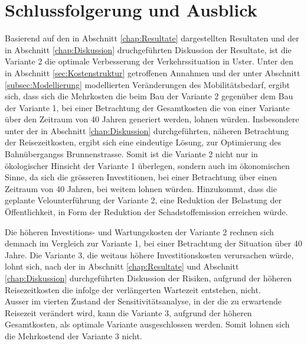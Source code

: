 %
%
%
%

\chapter{Schlussfolgerung und Ausblick}
\label{chap:Schlussfolgerung}


Basierend auf den in Abschnitt \ref{chap:Resultate} dargestellten Resultaten und der in Abschnitt \ref{chap:Diskussion} druchgeführten Diskussion der Resultate, ist die Variante 2 die optimale Verbesserung der Verkehrssituation in Uster. Unter den in Abschnitt \ref{sec:Kostenstruktur} getroffenen Annahmen und der unter Abschnitt \ref{subsec:Modellierung} modellierten Veränderungen des Mobilitätsbedarf, ergibt sich, dass sich die Mehrkosten die beim Bau der Variante 2 gegenüber dem Bau der Variante 1, bei einer Betrachtung der Gesamtkosten die von einer Variante über den Zeitraum von 40 Jahren generiert werden, lohnen würden. Insbesondere unter der in Abschnitt \ref{chap:Diskussion} durchgeführten, näheren Betrachtung der Reisezeitkosten, ergibt sich eine eindeutige Lösung, zur Optimierung des Bahnübergangss Brunnenstrasse. Somit ist die Variante 2 nicht nur in ökologischer Hinsicht der Variante 1 überlegen, sondern auch im ökonomischen Sinne, da sich die grösseren Investitionen, bei einer Betrachtung über einen Zeitraum von 40 Jahren, bei weitem lohnen würden. Hinzukommt, dass die geplante Velounterführung der Variante 2, eine Reduktion der Belastung der Öffentlichkeit, in Form der Reduktion der Schadstoffemission erreichen würde. 

Die höheren Investitions- und Wartungskosten der Variante 2 rechnen sich demnach im Vergleich zur Variante 1, bei einer Betrachtung der Situation über 40 Jahre. Die Variante 3, die weitaus höhere Investitionskosten verursachen würde, lohnt sich, nach der in Abschnitt \ref{chap:Resultate} und Abschnitt \ref{chap:Diskussion} durchgeführten Diskussion der Risiken, aufgrund der höheren Reisezeitkosten die infolge der verlängerten Wartezeit entstehen, nicht. \\
Ausser im vierten Zustand der Sensitivitätsanalyse, in der die zu erwartende Reisezeit verändert wird, kann die Variante 3, aufgrund der höheren Gesamtkosten, als optimale Variante ausgeschlossen werden. Somit lohnen sich die Mehrkostend der Variante 3 nicht.

